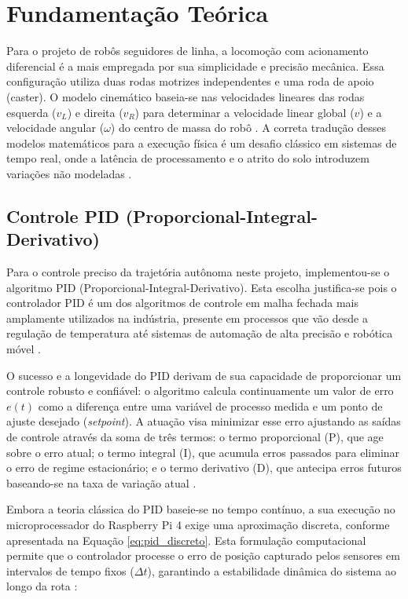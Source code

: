 \chapter{Fundamentação Teórica}

Para o projeto de robôs seguidores de linha, a locomoção com acionamento diferencial é a mais empregada por sua simplicidade e precisão mecânica. Essa configuração utiliza duas rodas motrizes independentes e uma roda de apoio (caster). O modelo cinemático baseia-se nas velocidades lineares das rodas esquerda ($v_L$) e direita ($v_R$) para determinar a velocidade linear global ($v$) e a velocidade angular ($\omega$) do centro de massa do robô \cite{siegwart2011introduction}. A correta tradução desses modelos matemáticos para a execução física é um desafio clássico em sistemas de tempo real, onde a latência de processamento e o atrito do solo introduzem variações não modeladas \cite{vega2025bridging}.

\section{Controle PID (Proporcional-Integral-Derivativo)}

Para o controle preciso da trajetória autônoma neste projeto, implementou-se o algoritmo PID (Proporcional-Integral-Derivativo). Esta escolha justifica-se pois o controlador PID é um dos algoritmos de controle em malha fechada mais amplamente utilizados na indústria, presente em processos que vão desde a regulação de temperatura até sistemas de automação de alta precisão e robótica móvel \cite{astrom2006advanced, ogata2010modern}.

O sucesso e a longevidade do PID derivam de sua capacidade de proporcionar um controle robusto e confiável: o algoritmo calcula continuamente um valor de erro $e(t)$ como a diferença entre uma variável de processo medida e um ponto de ajuste desejado (\textit{setpoint}). A atuação visa minimizar esse erro ajustando as saídas de controle através da soma de três termos: o termo proporcional (P), que age sobre o erro atual; o termo integral (I), que acumula erros passados para eliminar o erro de regime estacionário; e o termo derivativo (D), que antecipa erros futuros baseando-se na taxa de variação atual \cite{siegwart2011introduction}.

Embora a teoria clássica do PID baseie-se no tempo contínuo, a sua execução no microprocessador do Raspberry Pi 4 exige uma aproximação discreta, conforme apresentada na Equação \ref{eq:pid_discreto}. Esta formulação computacional permite que o controlador processe o erro de posição capturado pelos sensores em intervalos de tempo fixos ($\Delta t$), garantindo a estabilidade dinâmica do sistema ao longo da rota \cite{ferreira2023differential, baluja2024design, stark2026development}:

